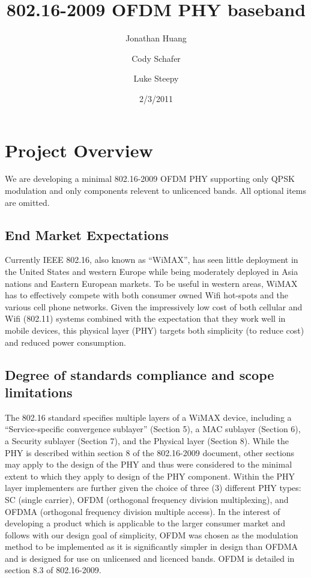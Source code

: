 \documentclass[10pt]{article}
\title{802.16-2009 OFDM PHY baseband}
\author{Jonathan Huang \and Cody Schafer \and Luke Steepy}
\date{2/3/2011}
\begin{document}
\maketitle
\section{Project Overview}
We are developing a minimal 802.16-2009 OFDM PHY supporting only QPSK
modulation and only components relevent to unlicenced bands. All
optional items are omitted.

	\subsection{End Market Expectations}
	Currently IEEE 802.16, also known as ``WiMAX'', has seen little deployment in the
	United States and western Europe while being moderately deployed in Asia
	nations and Eastern European markets. To be useful in western areas, WiMAX has
	to effectively compete with both consumer owned Wifi hot-spots and the various
	cell phone networks. Given the impressively low cost of both cellular and Wifi
	(802.11) systems combined with the expectation that they work well in mobile
	devices, this physical layer (PHY) targets both simplicity (to reduce cost) and
	reduced power consumption.

	\subsection{Degree of standards compliance and scope limitations}
	The 802.16 standard specifies multiple layers of a WiMAX device, including a
	“Service-specific convergence sublayer” (Section 5), a MAC sublayer (Section
	6), a Security sublayer (Section 7), and the Physical layer (Section 8). While
	the PHY is described within section 8 of the 802.16-2009 document, other
	sections may apply to the design of the PHY and thus were considered to the
	minimal extent to which they apply to design of the PHY component.  Within the
	PHY layer implementers are further given the choice of three (3) different PHY
	types: SC (single carrier), OFDM (orthogonal frequency division multiplexing),
	and OFDMA (orthogonal frequency division multiple access). In the interest of
	developing a product which is applicable to the larger consumer market and
	follows with our design goal of simplicity, OFDM was chosen as the modulation
	method to be implemented as it is significantly simpler in design than OFDMA
	and is designed for use on unlicensed and licenced bands. OFDM is detailed in
	section 8.3 of 802.16-2009.
\end{document}

